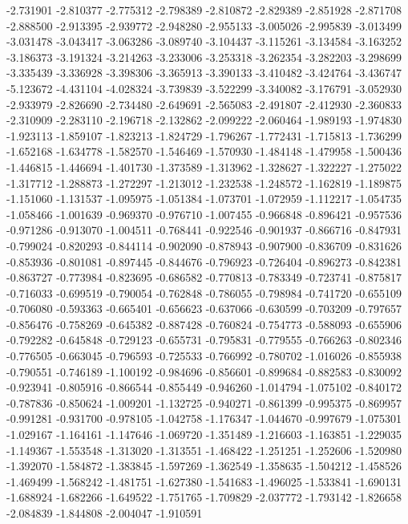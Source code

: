 -2.731901
-2.810377
-2.775312
-2.798389
-2.810872
-2.829389
-2.851928
-2.871708
-2.888500
-2.913395
-2.939772
-2.948280
-2.955133
-3.005026
-2.995839
-3.013499
-3.031478
-3.043417
-3.063286
-3.089740
-3.104437
-3.115261
-3.134584
-3.163252
-3.186373
-3.191324
-3.214263
-3.233006
-3.253318
-3.262354
-3.282203
-3.298699
-3.335439
-3.336928
-3.398306
-3.365913
-3.390133
-3.410482
-3.424764
-3.436747
-5.123672
-4.431104
-4.028324
-3.739839
-3.522299
-3.340082
-3.176791
-3.052930
-2.933979
-2.826690
-2.734480
-2.649691
-2.565083
-2.491807
-2.412930
-2.360833
-2.310909
-2.283110
-2.196718
-2.132862
-2.099222
-2.060464
-1.989193
-1.974830
-1.923113
-1.859107
-1.823213
-1.824729
-1.796267
-1.772431
-1.715813
-1.736299
-1.652168
-1.634778
-1.582570
-1.546469
-1.570930
-1.484148
-1.479958
-1.500436
-1.446815
-1.446694
-1.401730
-1.373589
-1.313962
-1.328627
-1.322227
-1.275022
-1.317712
-1.288873
-1.272297
-1.213012
-1.232538
-1.248572
-1.162819
-1.189875
-1.151060
-1.131537
-1.095975
-1.051384
-1.073701
-1.072959
-1.112217
-1.054735
-1.058466
-1.001639
-0.969370
-0.976710
-1.007455
-0.966848
-0.896421
-0.957536
-0.971286
-0.913070
-1.004511
-0.768441
-0.922546
-0.901937
-0.866716
-0.847931
-0.799024
-0.820293
-0.844114
-0.902090
-0.878943
-0.907900
-0.836709
-0.831626
-0.853936
-0.801081
-0.897445
-0.844676
-0.796923
-0.726404
-0.896273
-0.842381
-0.863727
-0.773984
-0.823695
-0.686582
-0.770813
-0.783349
-0.723741
-0.875817
-0.716033
-0.699519
-0.790054
-0.762848
-0.786055
-0.798984
-0.741720
-0.655109
-0.706080
-0.593363
-0.665401
-0.656623
-0.637066
-0.630599
-0.703209
-0.797657
-0.856476
-0.758269
-0.645382
-0.887428
-0.760824
-0.754773
-0.588093
-0.655906
-0.792282
-0.645848
-0.729123
-0.655731
-0.795831
-0.779555
-0.766263
-0.802346
-0.776505
-0.663045
-0.796593
-0.725533
-0.766992
-0.780702
-1.016026
-0.855938
-0.790551
-0.746189
-1.100192
-0.984696
-0.856601
-0.899684
-0.882583
-0.830092
-0.923941
-0.805916
-0.866544
-0.855449
-0.946260
-1.014794
-1.075102
-0.840172
-0.787836
-0.850624
-1.009201
-1.132725
-0.940271
-0.861399
-0.995375
-0.869957
-0.991281
-0.931700
-0.978105
-1.042758
-1.176347
-1.044670
-0.997679
-1.075301
-1.029167
-1.164161
-1.147646
-1.069720
-1.351489
-1.216603
-1.163851
-1.229035
-1.149367
-1.553548
-1.313020
-1.313551
-1.468422
-1.251251
-1.252606
-1.520980
-1.392070
-1.584872
-1.383845
-1.597269
-1.362549
-1.358635
-1.504212
-1.458526
-1.469499
-1.568242
-1.481751
-1.627380
-1.541683
-1.496025
-1.533841
-1.690131
-1.688924
-1.682266
-1.649522
-1.751765
-1.709829
-2.037772
-1.793142
-1.826658
-2.084839
-1.844808
-2.004047
-1.910591
